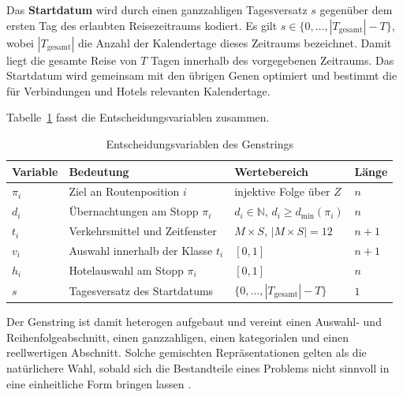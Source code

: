 Das \textbf{Startdatum} wird durch einen ganzzahligen Tagesversatz $s$ gegenüber dem ersten Tag des erlaubten Reisezeitraums kodiert. Es gilt $s \in \{0,\dots,|T_{\text{gesamt}}|-T\}$, wobei $|T_{\text{gesamt}}|$ die Anzahl der Kalendertage dieses Zeitraums bezeichnet. Damit liegt die gesamte Reise von $T$ Tagen innerhalb des vorgegebenen Zeitraums. Das Startdatum wird gemeinsam mit den übrigen Genen optimiert und bestimmt die für Verbindungen und Hotels relevanten Kalendertage.

Tabelle~\ref{tab:entscheidungsvariablen} fasst die Entscheidungsvariablen zusammen.

\begin{table}[H]
  \centering
  \begin{tabular}{@{}llll@{}}
    \toprule
    Variable & Bedeutung & Wertebereich & Länge \\
    \midrule
    $\pi_i$ & Ziel an Routenposition $i$ & injektive Folge über $Z$ & $n$ \\
    $d_i$   & Übernachtungen am Stopp $\pi_i$ & $d_i \in \mathbb{N}$, $d_i \geq d_{\min}(\pi_i)$ & $n$ \\
    $t_i$   & Verkehrsmittel und Zeitfenster & $M \times S$, $|M \times S| = 12$ & $n+1$ \\
    $v_i$   & Auswahl innerhalb der Klasse $t_i$ & $[0,1]$ & $n+1$ \\
    $h_i$   & Hotelauswahl am Stopp $\pi_i$ & $[0,1]$ & $n$ \\
    $s$     & Tagesversatz des Startdatums & $\{0,\dots,|T_{\text{gesamt}}|-T\}$ & $1$ \\
    \bottomrule
  \end{tabular}
  \caption{Entscheidungsvariablen des Genstrings}
  \label{tab:entscheidungsvariablen}
\end{table}

Der Genstring ist damit heterogen aufgebaut und vereint einen Auswahl- und Reihenfolgeabschnitt, einen ganzzahligen, einen kategorialen und einen reellwertigen Abschnitt. Solche gemischten Repräsentationen gelten als die natürlichere Wahl, sobald sich die Bestandteile eines Problems nicht sinnvoll in eine einheitliche Form bringen lassen \cite[49]{eibenSmithIntroductionEvolutionary2015}.

